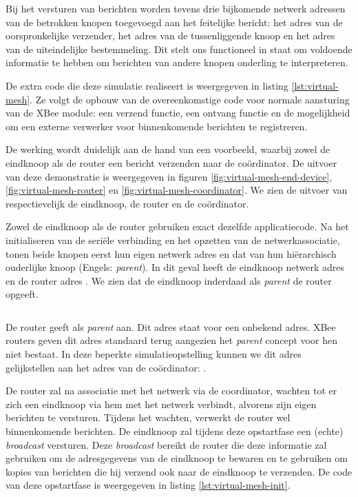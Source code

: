 Bij het versturen van berichten worden tevens drie bijkomende netwerk adressen
van de betrokken knopen toegevoegd aan het feitelijke bericht: het adres van de
oorspronkelijke verzender, het adres van de tussenliggende knoop en het adres
van de uiteindelijke bestemmeling. Dit stelt ons functioneel in staat om
voldoende informatie te hebben om berichten van andere knopen onderling te
interpreteren.

De extra code die deze simulatie realiseert is weergegeven in listing
\ref{lst:virtual-mesh}. Ze volgt de opbouw van de overeenkomstige code voor
normale aansturing van de XBee module: een verzend functie, een ontvang functie
en de mogelijkheid om een externe verwerker voor binnenkomende berichten te
registreren.

De werking wordt duidelijk aan de hand van een voorbeeld, waarbij zowel de
eindknoop als de router een bericht verzenden naar de co\"ordinator. De
uitvoer van deze demonstratie is weergegeven in figuren
\ref{fig:virtual-mesh-end-device}, \ref{fig:virtual-mesh-router} en
\ref{fig:virtual-mesh-coordinator}. We zien de uitvoer van respectievelijk de
eindknoop, de router en de co\"ordinator.

Zowel de eindknoop als de router gebruiken exact dezelfde applicatiecode. Na
het initialiseren van de seri\"ele verbinding en het opzetten van de
netwerkassociatie, tonen beide knopen eerst hun eigen netwerk adres en dat van
hun hi\"erarchisch ouderlijke knoop (Engels: \emph{parent}). In dit geval heeft
de eindknoop netwerk adres  en de router adres . We zien
dat de eindknoop inderdaad als \emph{parent} de router opgeeft.

\inputminted[linenos,frame=lines,framesep=2mm,fontsize=\footnotesize,firstline=97,firstnumber=97]{c}{../src/demo/lib/network.c}
\vspace{-5mm}
\vspace{3mm}

De router geeft als \emph{parent}  aan. Dit adres staat voor een
onbekend adres. XBee routers geven dit adres standaard terug aangezien het
\emph{parent} concept voor hen niet bestaat. In deze beperkte
simulatieopstelling kunnen we dit adres gelijkstellen aan het adres van de
co\"ordinator: .

De router zal na associatie met het netwerk via de coordinator, wachten tot er
zich een eindknoop via hem met het netwerk verbindt, alvorens zijn eigen
berichten te versturen. Tijdens het wachten, verwerkt de router wel
binnenkomende berichten. De eindknoop zal tijdens deze opstartfase een (echte)
\emph{broadcast} versturen. Deze \emph{broadcast} bereikt de router die deze
informatie zal gebruiken om de adresgegevens van de eindknoop te bewaren en te
gebruiken om kopies van berichten die hij verzend ook naar de eindknoop te
verzenden. De code van deze opstartfase is weergegeven in listing
\ref{lst:virtual-mesh-init}.


